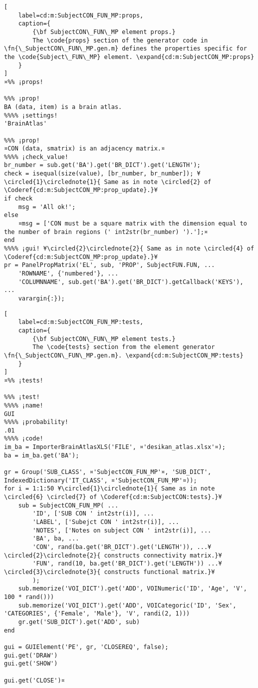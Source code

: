 \documentclass{tufte-handout}
\begin{document}
\begin{lstlisting}[
	label=cd:m:SubjectCON_FUN_MP:props,
	caption={
		{\bf SubjectCON\_FUN\_MP element props.}
		The \code{props} section of the generator code in \fn{\_SubjectCON\_FUN\_MP.gen.m} defines the properties specific for the \code{Subject\_FUN\_MP} element. \expand{cd:m:SubjectCON_MP:props}
	}
]
¤%% ¡props!

%%% ¡prop!
BA (data, item) is a brain atlas.
%%%% ¡settings!
'BrainAtlas'

%%% ¡prop!
¤CON (data, smatrix) is an adjacency matrix.¤
%%%% ¡check_value!
br_number = sub.get('BA').get('BR_DICT').get('LENGTH');
check = isequal(size(value), [br_number, br_number]); ¥\circled{1}\circlednote{1}{ Same as in note \circled{2} of \Coderef{cd:m:SubjectCON_MP:prop_update}.}¥
if check
    msg = 'All ok!';
else   
    ¤msg = ['CON must be a square matrix with the dimension equal to the number of brain regions (' int2str(br_number) ').'];¤
end
%%%% ¡gui! ¥\circled{2}\circlednote{2}{ Same as in note \circled{4} of \Coderef{cd:m:SubjectCON_MP:prop_update}.}¥
pr = PanelPropMatrix('EL', sub, 'PROP', SubjectFUN.FUN, ...
    'ROWNAME', {'numbered'}, ...
    'COLUMNNAME', sub.get('BA').get('BR_DICT').getCallback('KEYS'), ...
    varargin{:});

\end{lstlisting}

\begin{lstlisting}[
	label=cd:m:SubjectCON_FUN_MP:tests,
	caption={
		{\bf SubjectCON\_FUN\_MP element tests.}
		The \code{tests} section from the element generator \fn{\_SubjectCON\_FUN\_MP.gen.m}. \expand{cd:m:SubjectCON_MP:tests}
	}
]
¤%% ¡tests!

%%% ¡test!
%%%% ¡name!
GUI
%%%% ¡probability!
.01
%%%% ¡code!
im_ba = ImporterBrainAtlasXLS('FILE', ¤'desikan_atlas.xlsx'¤);
ba = im_ba.get('BA');

gr = Group('SUB_CLASS', ¤'SubjectCON_FUN_MP'¤, 'SUB_DICT', IndexedDictionary('IT_CLASS', ¤'SubjectCON_FUN_MP'¤));
for i = 1:1:50 ¥\circled{1}\circlednote{1}{ Same as in note \circled{6} \circled{7} of \Coderef{cd:m:SubjectCON:tests}.}¥
    sub = SubjectCON_FUN_MP( ...
        'ID', ['SUB CON ' int2str(i)], ...
        'LABEL', ['Subejct CON ' int2str(i)], ...
        'NOTES', ['Notes on subject CON ' int2str(i)], ...
        'BA', ba, ...
        'CON', rand(ba.get('BR_DICT').get('LENGTH')), ...¥\circled{2}\circlednote{2}{ constructs connectivity matrix.}¥
        'FUN', rand(10, ba.get('BR_DICT').get('LENGTH')) ...¥\circled{3}\circlednote{3}{ constructs functional matrix.}¥
        );
    sub.memorize('VOI_DICT').get('ADD', VOINumeric('ID', 'Age', 'V', 100 * rand()))
    sub.memorize('VOI_DICT').get('ADD', VOICategoric('ID', 'Sex', 'CATEGORIES', {'Female', 'Male'}, 'V', randi(2, 1)))
    gr.get('SUB_DICT').get('ADD', sub)
end

gui = GUIElement('PE', gr, 'CLOSEREQ', false);
gui.get('DRAW')
gui.get('SHOW')

gui.get('CLOSE')¤
\end{lstlisting}
\end{document}
